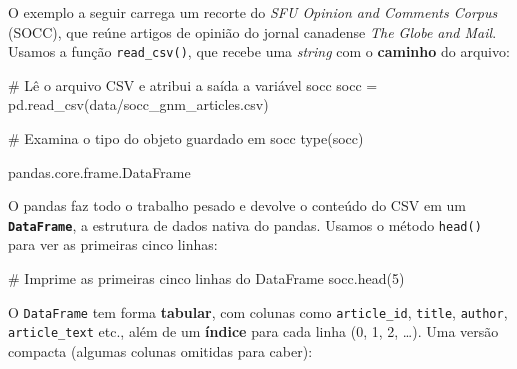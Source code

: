 \documentclass[
  brazilian,
  11pt,
]{article}
\newenvironment{Shaded}{\begin{snugshade}}{\end{snugshade}}
\newcommand{\BuiltInTok}[1]{\textcolor[rgb]{0.50,0.55,0.55}{#1}}
\newcommand{\CommentTok}[1]{\textcolor[rgb]{0.48,0.49,0.49}{#1}}
\newcommand{\DecValTok}[1]{\textcolor[rgb]{0.96,0.45,0.00}{#1}}
\newcommand{\NormalTok}[1]{\textcolor[rgb]{0.81,0.81,0.76}{#1}}
\newcommand{\OperatorTok}[1]{\textcolor[rgb]{0.81,0.81,0.76}{#1}}
\newcommand{\StringTok}[1]{\textcolor[rgb]{0.96,0.31,0.31}{#1}}
\let\oldtexttt\texttt
\renewcommand{\texttt}[1]{{\color{inlink}\oldtexttt{#1}}}
\begin{document}
O exemplo a seguir carrega um recorte do \emph{SFU Opinion and Comments
Corpus} (SOCC), que reúne artigos de opinião do jornal canadense
\emph{The Globe and Mail}. Usamos a função \texttt{read\_csv()}, que
recebe uma \emph{string} com o \textbf{caminho} do arquivo:

\begin{Shaded}
\begin{Highlighting}[]
\CommentTok{\# Lê o arquivo CSV e atribui a saída a variável \textquotesingle{}socc\textquotesingle{}}
\NormalTok{socc }\OperatorTok{=}\NormalTok{ pd.read\_csv(}\StringTok{\textquotesingle{}data/socc\_gnm\_articles.csv\textquotesingle{}}\NormalTok{)}

\CommentTok{\# Examina o tipo do objeto guardado em \textquotesingle{}socc\textquotesingle{}}
\BuiltInTok{type}\NormalTok{(socc)}
\end{Highlighting}
\end{Shaded}

\begin{Shaded}
\begin{Highlighting}[]
\NormalTok{pandas.core.frame.DataFrame}
\end{Highlighting}
\end{Shaded}

O pandas faz todo o trabalho pesado e devolve o conteúdo do CSV em um
\textbf{\texttt{DataFrame}}, a estrutura de dados nativa do pandas.
Usamos o método \texttt{head()} para ver as primeiras cinco linhas:

\begin{Shaded}
\begin{Highlighting}[]
\CommentTok{\# Imprime as primeiras cinco linhas do DataFrame}
\NormalTok{socc.head(}\DecValTok{5}\NormalTok{)}
\end{Highlighting}
\end{Shaded}

O \texttt{DataFrame} tem forma \textbf{tabular}, com colunas como
\texttt{article\_id}, \texttt{title}, \texttt{author},
\texttt{article\_text} etc., além de um \textbf{índice} para cada linha
(0, 1, 2, \ldots). Uma versão compacta (algumas colunas omitidas para
caber):
\end{document}

